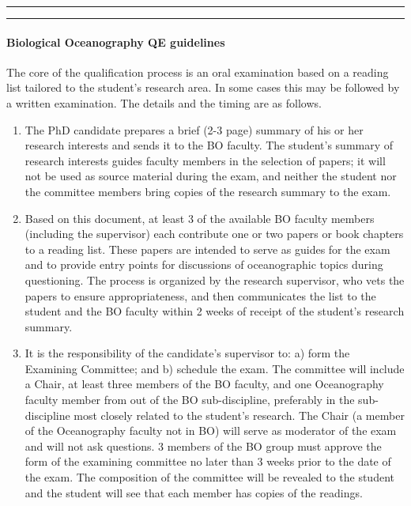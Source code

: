 \hrule



\hrule

\paragraph{Biological Oceanography QE guidelines}\hfill

\cp
\p The core of the qualification process is an oral examination based on a reading
list tailored to the student's research area. In some cases this may be
followed by a written examination. The details and the timing are as follows.

\begin{enumerate}

\item The PhD candidate prepares a brief (2-3 page) summary of his or her
research interests and sends it to the BO faculty. The student's summary of
research interests guides faculty members in the selection of papers; it will
not be used as source material during the exam, and neither the student nor the
committee members bring copies of the research summary to the exam.

\item Based on this document, at least 3 of the available BO faculty members
(including the supervisor) each contribute one or two papers or book chapters
to a reading list. These papers are intended to serve as guides for the exam
and to provide entry points for discussions of oceanographic topics during
questioning. The process is organized by the research supervisor, who vets the
papers to ensure appropriateness, and then communicates the list to the student
and the BO faculty within 2 weeks of receipt of the student's research summary.

\item It is the responsibility of the candidate's supervisor to: a) form the
Examining Committee; and b) schedule the exam. The committee will include a
Chair, at least three members of the BO faculty, and one Oceanography faculty
member from out of the BO sub-discipline, preferably in the sub-discipline most
closely related to the student's research. The Chair (a member of the
Oceanography faculty not in BO) will serve as moderator of the exam and will
not ask questions. 3 members of the BO group must approve the form of the
examining committee no later than 3 weeks prior to the date of the exam. The
composition of the committee will be revealed to the student and the student
will see that each member has copies of the readings.


\end{enumerate}
